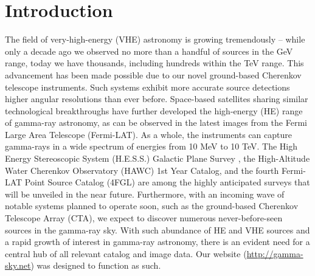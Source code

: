 \section{Introduction}

The field of very-high-energy (VHE) astronomy is growing tremendously – while only a decade ago we observed no more than a handful of sources in the GeV range, today we have thousands, including hundreds within the TeV range. This advancement has been made possible due to our novel ground-based Cherenkov telescope instruments. Such systems exhibit more accurate source detections higher angular resolutions than ever before. Space-based satellites sharing similar technological breakthroughs have further developed the high-energy (HE) range of gamma-ray astronomy, as can be observed in the latest images from the Fermi Large Area Telescope (Fermi-LAT). As a whole, the instruments can capture gamma-rays in a wide spectrum of energies from 10 MeV to 10 TeV. The High Energy Stereoscopic System (H.E.S.S.) Galactic Plane Survey \cite{hgps}, the High-Altitude Water Cherenkov Observatory (HAWC) 1st Year Catalog, and the fourth Fermi-LAT Point Source Catalog (4FGL) are among the highly anticipated surveys that will be unveiled in the near future. Furthermore, with an incoming wave of notable systems planned to operate soon, such as the ground-based Cherenkov Telescope Array (CTA), we expect to discover numerous never-before-seen sources in the gamma-ray sky. With such abundance of HE and VHE sources and a rapid growth of interest in gamma-ray astronomy, there is an evident need for a central hub of all relevant catalog and image data. Our website (\url{http://gamma-sky.net}) was designed to function as such.
